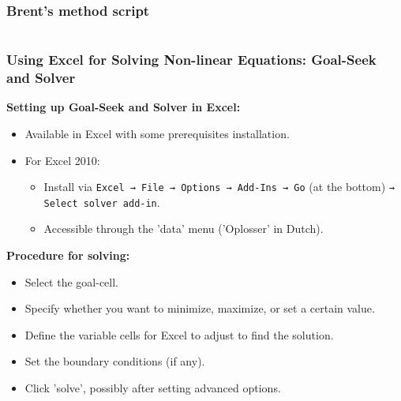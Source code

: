 \begin{frame}[fragile]
  \frametitle{Brent's method script}
  \begin{columns}
  
  
  \end{columns}
\end{frame}



\begin{frame}[fragile]
    \frametitle{Using Excel for Solving Non-linear Equations: Goal-Seek and Solver}

    \textbf{Setting up Goal-Seek and Solver in Excel:}
    \begin{itemize}
        \item Available in Excel with some prerequisites installation.
        \item For Excel 2010:
        \begin{itemize}
            \item Install via \texttt{Excel → File → Options → Add-Ins → Go} (at the bottom) \texttt{→ Select solver add-in}.
            \item Accessible through the 'data' menu ('Oplosser' in Dutch).
        \end{itemize}
    \end{itemize}

    \textbf{Procedure for solving:}
    \begin{itemize}
        \item Select the goal-cell.
        \item Specify whether you want to minimize, maximize, or set a certain value.
        \item Define the variable cells for Excel to adjust to find the solution.
        \item Set the boundary conditions (if any).
        \item Click 'solve', possibly after setting advanced options.
    \end{itemize}
\end{frame}

